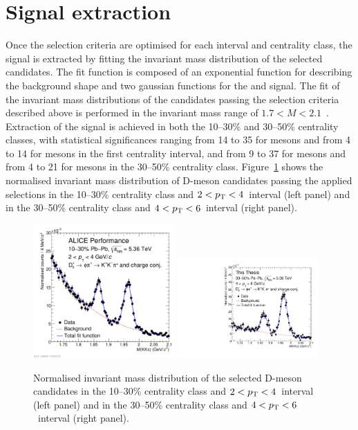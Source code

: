 \section{Signal extraction}
Once the selection criteria are optimised for each \pt interval and centrality class, the signal is extracted by fitting the invariant mass distribution of the selected candidates. The fit function is composed of an exponential function for describing the background shape and two gaussian functions for the \ds and \dpl signal. The fit of the invariant mass distributions of the candidates passing the selection criteria described above is performed in the invariant mass range of $1.7 < M < 2.1$~\gevcc. Extraction of the signal is achieved in both the 10--30\% and 30--50\% centrality classes, with statistical significances ranging from 14 to 35 for \ds mesons and from 4 to 14 for \dpl mesons in the first centrality interval, and from 9 to 37 for \ds mesons and from 4 to 21 for \dpl mesons in the 30--50\% centrality class. Figure~\ref{fig:inv_mass_fit_pbpb} shows the normalised invariant mass distribution of D-meson candidates passing the applied selections in the 10--30\% centrality class and $2<p_\mathrm{T}<4$~\gevc interval (left panel) and in the 30--50\% centrality class and $4<p_\mathrm{T}<6$~\gevc interval (right panel). 

\begin{figure}
    \centering
    \includegraphics[width=0.48\textwidth]{Figures/Chapter 8/ds_massfit_norm_1030.pdf}
    \includegraphics[width=0.48\textwidth]{Figures/Chapter 8/ds_massfit_norm_3050.pdf}
    \caption{Normalised invariant mass distribution of the selected D-meson candidates in the 10--30\% centrality class and $2<p_\mathrm{T}<4$~\gevc interval (left panel) and in the 30--50\% centrality class and $4<p_\mathrm{T}<6$~\gevc interval (right panel).}
    \label{fig:inv_mass_fit_pbpb}
\end{figure}


